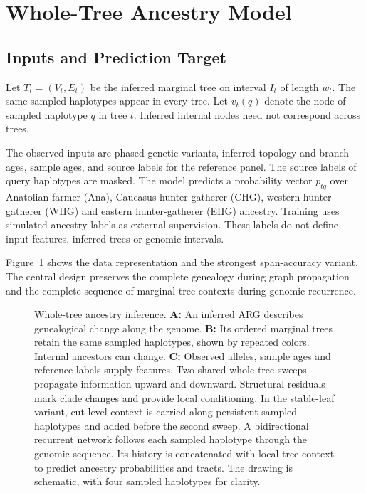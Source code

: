 \documentclass[letterpaper]{article}
\begin{document}
\section{Whole-Tree Ancestry Model}
\subsection{Inputs and Prediction Target}
Let $T_t=(V_t,E_t)$ be the inferred marginal tree on interval $I_t$ of length $w_t$. The same sampled haplotypes appear in every tree. Let $v_t(q)$ denote the node of sampled haplotype $q$ in tree $t$. Inferred internal nodes need not correspond across trees.

The observed inputs are phased genetic variants, inferred topology and branch ages, sample ages, and source labels for the reference panel. The source labels of query haplotypes are masked. The model predicts a probability vector $p_{tq}$ over Anatolian farmer (Ana), Caucasus hunter-gatherer (CHG), western hunter-gatherer (WHG) and eastern hunter-gatherer (EHG) ancestry. Training uses simulated ancestry labels as external supervision. These labels do not define input features, inferred trees or genomic intervals.

Figure~\ref{fig:architecture} shows the data representation and the strongest span-accuracy variant. The central design preserves the complete genealogy during graph propagation and the complete sequence of marginal-tree contexts during genomic recurrence.

\begin{figure}[t]
\centering

\caption{Whole-tree ancestry inference. \textbf{A:} An inferred ARG describes genealogical change along the genome. \textbf{B:} Its ordered marginal trees retain the same sampled haplotypes, shown by repeated colors. Internal ancestors can change. \textbf{C:} Observed alleles, sample ages and reference labels supply features. Two shared whole-tree sweeps propagate information upward and downward. Structural residuals mark clade changes and provide local conditioning. In the stable-leaf variant, cut-level context is carried along persistent sampled haplotypes and added before the second sweep. A bidirectional recurrent network follows each sampled haplotype through the genomic sequence. Its history is concatenated with local tree context to predict ancestry probabilities and tracts. The drawing is schematic, with four sampled haplotypes for clarity.}
\label{fig:architecture}
\end{figure}
\end{document}
